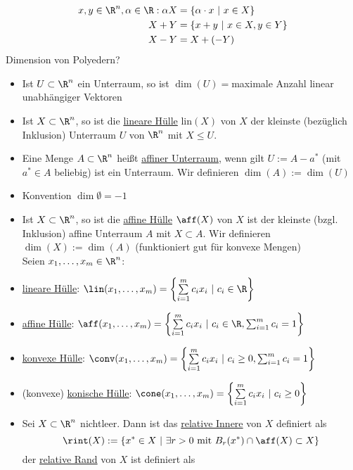 \begin{align*}
	x,y \in \R^n, \alpha \in \R: \alpha X &= \left\{ \alpha \cdot x \ |\ x \in X \right\}\\
										  X + Y &=\left\{ x + y  \ |\ x \in X, y \in Y \right\}\\
										  X - Y &= X + (-Y)
\end{align*}
Dimension von Polyedern?
\begin{itemize}
	\item Ist $U \subset  \R^n$ ein Unterraum, so ist $\dim(U)=$maximale Anzahl linear unabhängiger Vektoren
	\item Ist $X \subset \R^n$, so ist die \underline{lineare Hülle} lin$(X)$ von $X$ der kleinste (bezüglich Inklusion) Unterraum $U$ von $\R^n$ mit $X \leq U$.
	\item Eine Menge $A \subset  \R^n$ heißt \underline{affiner Unterraum}, wenn gilt $U:=A-a^*$ (mit $a^* \in A$ beliebig) ist ein Unterraum.
		Wir definieren $\dim(A) := \dim(U)$ 
	\item Konvention $\dim\emptyset=-1$ 
	\item Ist $X\subset \R^n$, so ist die \underline{affine Hülle} $\aff(X)$ von $X$ ist der kleinste (bzgl. Inklusion) affine Unterraum $A$ mit $X\subset A$.
		Wir definieren $\dim(X):=\dim(A)$ (funktioniert gut für konvexe Mengen)\\
		Seien $x_{1},\dots ,x_{m}\in\R^n$:
	\item \underline{lineare Hülle}: $\lin(x_{1},\dots ,x_{m})= \left\{ \sum\limits_{i=1}^{m} c_{i}x_{i}\ | \ c_{i}\in \R \right\}$
	\item \underline{affine Hülle}: $\aff(x_{1},\dots ,x_{m})= \left\{ \sum\limits_{i=1}^{m} c_{i}x_{i}\ | \ c_{i}\in \R, \sum_{i=1}^{m} c_{i}= 1 \right\}$
	\item \underline{konvexe Hülle}: $\conv(x_{1},\dots ,x_{m})= \left\{ \sum\limits_{i=1}^{m} c_{i}x_{i}\ | \ c_{i}\geq 0, \sum_{i=1}^{m} c_{i}= 1 \right\}$
	\item (konvexe) \underline{konische Hülle}: $\cone(x_{1},\dots ,x_{m})= \left\{ \sum\limits_{i=1}^{m} c_{i}x_{i}\ | \ c_{i}\geq 0 \right\}$
	\item Sei $X \subset \R^n$ nichtleer. Dann ist das \underline{relative Innere} von $X$ definiert als 
		\begin{equation*}
			\rint(X):= \left\{ x^* \in X \ |\ \exists r >0 \text{ mit } B_{r}(x^*)\cap\aff(X) \subset X \right\}
		\end{equation*}
		der \underline{relative Rand} von $X$ ist definiert als 

\end{itemize}
